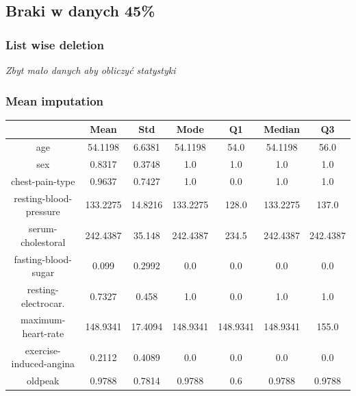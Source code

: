 \documentclass{classrep}
\begin{document}
{{{            }
        }
        \newpage

        \subsection{Braki w danych 45\%}
        \label{results:45-percent} {

            \subsubsection{List wise deletion}
            \label{results:45-percent:list-wise} {
                \textit{Zbyt mało danych aby obliczyć statystyki}
            }

            \subsubsection{Mean imputation}
            \label{results:45-percent:mean-input} {
                \begin{table}[!htbp]
                    \centering
                    \begin{tabular}{|c|c|c|c|c|c|c|}
                        \hline
                        & Mean & Std & Mode & Q1 & Median & Q3 \\ \hline
                        age & 54.1198 & 6.6381 & 54.1198 & 54.0 & 54.1198 & 56.0 \\ \hline
                        sex & 0.8317 & 0.3748 & 1.0 & 1.0 & 1.0 & 1.0 \\ \hline
                        chest-pain-type & 0.9637 & 0.7427 & 1.0 & 0.0 & 1.0 & 1.0 \\ \hline
                        resting-blood-pressure & 133.2275 & 14.8216 & 133.2275 & 128.0 & 133.2275 & 137.0 \\ \hline
                        serum-cholestoral & 242.4387 & 35.148 & 242.4387 & 234.5 & 242.4387 & 242.4387 \\ \hline
                        fasting-blood-sugar & 0.099 & 0.2992 & 0.0 & 0.0 & 0.0 & 0.0 \\ \hline
                        resting-electrocar. & 0.7327 & 0.458 & 1.0 & 0.0 & 1.0 & 1.0 \\ \hline
                        maximum-heart-rate & 148.9341 & 17.4094 & 148.9341 & 148.9341 & 148.9341 & 155.0 \\ \hline
                        exercise-induced-angina & 0.2112 & 0.4089 & 0.0 & 0.0 & 0.0 & 0.0 \\ \hline
                        oldpeak & 0.9788 & 0.7814 & 0.9788 & 0.6 & 0.9788 & 0.9788 \\ \hline

\end{tabular}
\end{table}}}}
\end{document}
